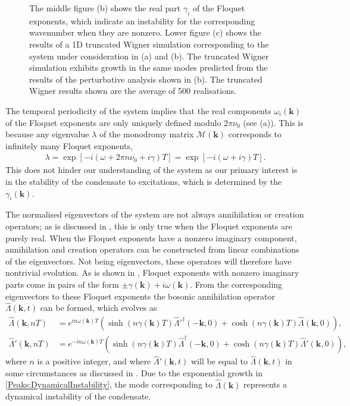\begin{figure}
{        The middle figure (b) shows the real part $\gamma_i$ of the Floquet exponents, which indicate an instability for the corresponding wavenumber when they are nonzero.
        Lower figure (c) shows the results of a 1D truncated Wigner simulation corresponding to the system under consideration in (a) and (b). The truncated Wigner simulation exhibits growth in the same modes predicted from the results of the perturbative analysis shown in (b). The truncated Wigner results shown are the average of 500 realisations.
        \label{Peaks:CondensateEigenvalues}}
\end{figure}

The temporal periodicity of the system implies that the real components $\omega_i(\bm{k})$ of the Floquet exponents are only uniquely defined modulo $2\pi \nu_0$ (see (a)). This is because any eigenvalue $\lambda$ of the monodromy matrix $\mathcal{M}(\bm{k})$ corresponds to infinitely many Floquet exponents,
\begin{align}
    \label{Peaks:AmbiguityFloquetExponent}
    \lambda = \exp\left[-i \left(\omega + 2 \pi n \nu_0 + i \gamma\right)T\right] = \exp\left[-i\left(\omega + i \gamma\right)T\right].
\end{align}
This does not hinder our understanding of the system as our primary interest is in the stability of the condensate to excitations, which is determined by the $\gamma_i(\bm{k})$.

The normalised eigenvectors of the system are not always annihilation or creation operators; as is discussed in , this is only true when the Floquet exponents are purely real. When the Floquet exponents have a nonzero imaginary component, annihilation and creation operators can be constructed from linear combinations of the eigenvectors. Not being eigenvectors, these operators will therefore have nontrivial evolution. As is shown in , Floquet exponents with nonzero imaginary parts come in pairs of the form $\pm \gamma(\bm{k}) + i \omega(\bm{k})$. From the corresponding eigenvectors to these Floquet exponents the bosonic annihilation operator $\hat{\Lambda}(\bm{k}, t)$ can be formed, which evolves as
\begin{subequations}
    \label{Peaks:DynamicalInstability}
    \begin{align}
        \hat{\Lambda}(\bm{k}, nT) &= e^{i n\omega(\bm{k}) T} \left( \sinh(n\gamma(\bm{k}) T) \hat{\Lambda}'^\dagger(-\bm{k}, 0) + \cosh(n\gamma(\bm{k}) T) \hat{\Lambda}(\bm{k}, 0)\right),\\
        \hat{\Lambda}'(\bm{k}, nT) &= e^{-i n \omega(\bm{k}) T} \left( \sinh(n\gamma(\bm{k}) T) \hat{\Lambda}^\dagger(-\bm{k}, 0) + \cosh(n\gamma(\bm{k}) T) \hat{\Lambda}'(\bm{k}, 0)\right),
    \end{align}
\end{subequations}
where $n$ is a positive integer, and where $\hat{\Lambda}'(\bm{k}, t)$ will be equal to $\hat{\Lambda}(\bm{k}, t)$ in some circumstances as discussed in . Due to the exponential growth in \eqref{Peaks:DynamicalInstability}, the mode corresponding to $\hat{\Lambda}(\bm{k})$ represents a dynamical instability of the condensate.

